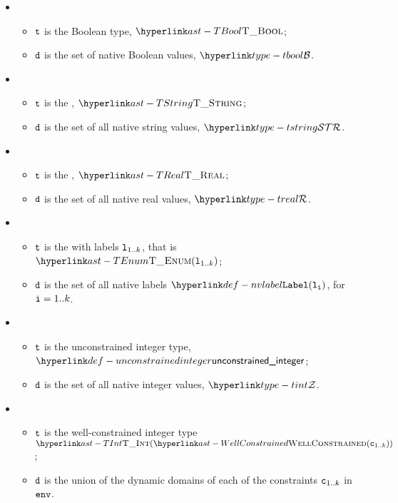 \ProseParagraph
\OneApplies
\begin{itemize}
  \item {}
  \begin{itemize}
    \item $\texttt{t}$ is the Boolean type, $\TBool$;
    \item $\texttt{d}$ is the set of native Boolean values, $\tbool$.
  \end{itemize}

  \item {}
  \begin{itemize}
    \item $\texttt{t}$ is the \stringtypeterm{}, $\TString$;
    \item $\texttt{d}$ is the set of all native string values, $\tstring$.
  \end{itemize}

  \item {}
  \begin{itemize}
    \item $\texttt{t}$ is the \realtypeterm{}, $\TReal$;
    \item $\texttt{d}$ is the set of all native real values, $\treal$.
  \end{itemize}

  \item {}
  \begin{itemize}
    \item $\texttt{t}$ is the \enumerationtypeterm{} with labels $\texttt{l}_{1..k}$, that is $\TEnum(\vl_{1..k})$;
    \item $\texttt{d}$ is the set of all native labels $\nvlabel(\vl_\vi)$, for $\texttt{i} = 1..k$.
  \end{itemize}

  \item {}
  \begin{itemize}
    \item $\texttt{t}$ is the unconstrained integer type, $\unconstrainedinteger$;
    \item $\texttt{d}$ is the set of all native integer values, $\tint$.
  \end{itemize}

  \item {}
  \begin{itemize}
    \item $\texttt{t}$ is the well-constrained integer type $\TInt(\WellConstrained(\vc_{1..k}))$;
    \item $\texttt{d}$ is the union of the dynamic domains of each of the constraints $\texttt{c}_{1..k}$ in $\texttt{env}$.
  \end{itemize}


\end{itemize}
